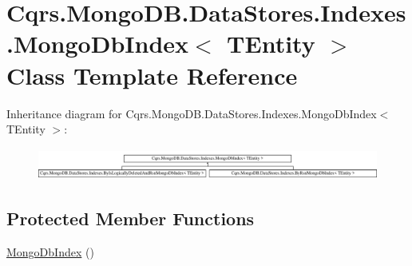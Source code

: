\hypertarget{classCqrs_1_1MongoDB_1_1DataStores_1_1Indexes_1_1MongoDbIndex}{}\section{Cqrs.\+Mongo\+D\+B.\+Data\+Stores.\+Indexes.\+Mongo\+Db\+Index$<$ T\+Entity $>$ Class Template Reference}
\label{classCqrs_1_1MongoDB_1_1DataStores_1_1Indexes_1_1MongoDbIndex}
Inheritance diagram for Cqrs.\+Mongo\+D\+B.\+Data\+Stores.\+Indexes.\+Mongo\+Db\+Index$<$ T\+Entity $>$\+:\begin{figure}[H]
\begin{center}
\leavevmode
\includegraphics[height=1.052632cm]{classCqrs_1_1MongoDB_1_1DataStores_1_1Indexes_1_1MongoDbIndex}
\end{center}
\end{figure}
\subsection*{Protected Member Functions}
\begin{DoxyCompactItemize}
\item 
\hyperlink{classCqrs_1_1MongoDB_1_1DataStores_1_1Indexes_1_1MongoDbIndex_a61f4b17dd968f92e81562c70ae062a89_a61f4b17dd968f92e81562c70ae062a89}{Mongo\+Db\+Index} ()
\end{DoxyCompactItemize}
